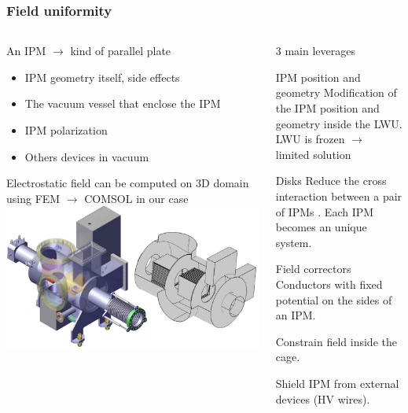 \begin{frame}
  \frametitle{Field uniformity}
  \begin{columns}[T]
    \begin{column}{0.45\textwidth}
      An IPM $\rightarrow$ kind of parallel plate
      \begin{itemize}
        \item IPM geometry itself, side effects
        \item The vacuum vessel that enclose the IPM
        \item IPM polarization
        \item Others devices in vacuum
      \end{itemize}
      Electrostatic field can be computed on 3D domain using FEM $\rightarrow$ COMSOL in our case
      \includegraphics[width=1\textwidth]{03_SIM/fig/fig003_COMSOL_LWU}
    \end{column}
    \begin{column}{0.45\textwidth}
      3 main leverages
      \begin{block}{IPM position and geometry}
        Modification of the IPM position and geometry inside the LWU.
        LWU is frozen $\rightarrow$ limited solution
      \end{block}
      \begin{block}{Disks}
        Reduce the cross interaction between a pair of IPMs
        .
        Each IPM becomes an unique system.
      \end{block}
      \begin{block}{Field correctors}
        Conductors with fixed potential on the sides of an IPM.

        Constrain field inside the cage.

        Shield IPM from external devices (HV wires).
      \end{block}
    \end{column}
  \end{columns}


\end{frame}

